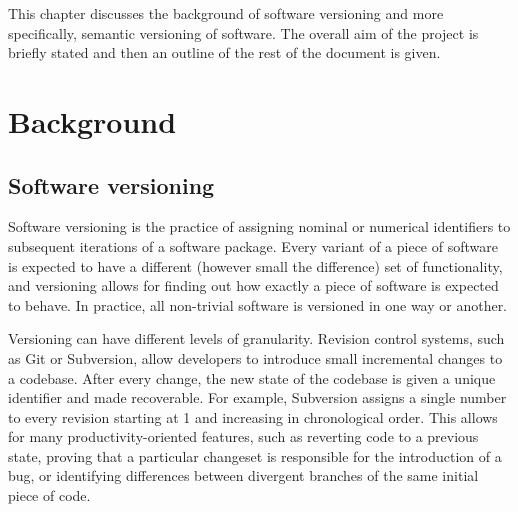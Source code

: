 \documentclass{l4proj}
\begin{document}
This chapter discusses the background of software versioning and more
specifically, semantic versioning of software.
The overall aim of the project is briefly stated and then an outline
of the rest of the document is given.

\section{Background}

\subsection{Software versioning}
Software versioning is the practice of assigning nominal or numerical
identifiers to subsequent iterations of a software package. Every
variant of a piece of software is expected to have a different
(however small the difference) set of functionality, and versioning
allows for finding out how exactly a piece of software is expected to
behave. In practice, all non-trivial software is versioned in one way
or another.

Versioning can have different levels of granularity. Revision control
systems, such as Git or Subversion, allow developers to introduce
small incremental changes to a codebase. After every change, the new
state of the codebase is given a unique identifier and made
recoverable. For example, Subversion assigns a single number to every
revision starting at 1 and increasing in chronological order. This
allows for many productivity-oriented features, such as reverting code
to a previous state, proving that a particular changeset is
responsible for the introduction of a bug, or identifying differences
between divergent branches of the same initial piece of code.
\end{document}
